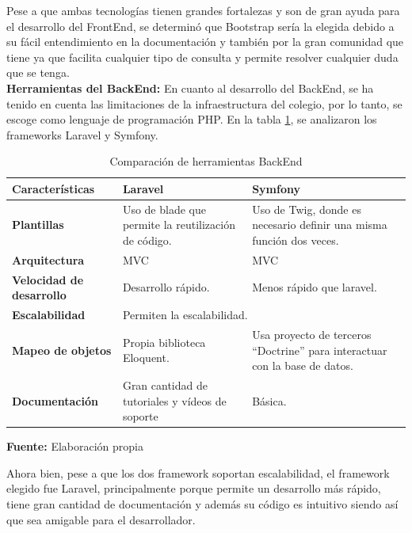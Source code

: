 Pese a que ambas tecnologías tienen grandes fortalezas y son de gran ayuda para el desarrollo del FrontEnd, se determinó que Bootstrap sería la elegida debido a su fácil entendimiento en la documentación y también por la gran comunidad que tiene ya que facilita cualquier tipo de consulta y permite resolver cualquier duda que se tenga. \ \\

\textbf{Herramientas del BackEnd: }En cuanto al desarrollo del BackEnd, se ha tenido en cuenta las limitaciones de la infraestructura del colegio, por lo tanto, se escoge como lenguaje de programación PHP. En la tabla \ref{tab:backEnd}, se analizaron los frameworks  Laravel y Symfony.

\begin{table}[H]
    \centering
    \begin{tabular}{|p{3cm}|p{6cm}|p{6cm}|}
        \hline
        \textbf{Características}&\textbf{Laravel}&\textbf{Symfony}\\
        \hline
         \textbf{Plantillas}&Uso de blade que permite la reutilización de código.&Uso de Twig, donde es necesario definir una misma función dos veces. \\
        \hline
        \textbf{Arquitectura}&MVC&MVC \\
        \hline
        \textbf{Velocidad de desarrollo}&Desarrollo rápido.&Menos rápido que laravel.\\
        \hline
        \multicolumn{1}{|p{3cm}|}{ \textbf{Escalabilidad}}&\multicolumn{2}{|p{12cm}|}{Permiten la escalabilidad.}\\
        \hline
        \textbf{Mapeo de objetos}&Propia biblioteca Eloquent.&Usa proyecto de terceros “Doctrine” para interactuar con la base de datos.\\
        \hline
        \textbf{Documentación}&Gran cantidad de tutoriales y vídeos de soporte&Básica.\\
        \hline
    \end{tabular}
    \caption{Comparación de herramientas BackEnd}
    \centering \scriptsize \textbf{Fuente:} Elaboración propia
    \label{tab:backEnd}
\end{table}

Ahora bien, pese a que los dos framework soportan escalabilidad, el framework elegido fue Laravel, principalmente porque permite un desarrollo más rápido, tiene gran cantidad de documentación y además su código es intuitivo siendo así que sea amigable para el desarrollador.

